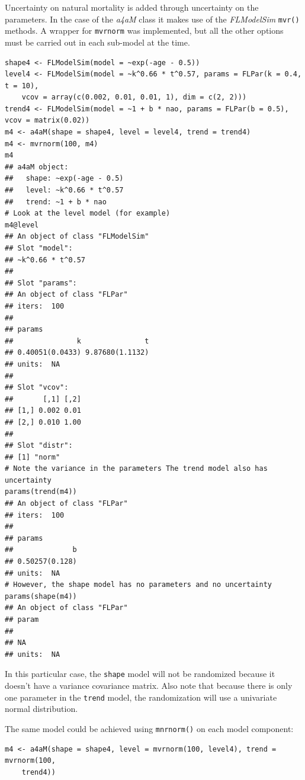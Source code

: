 \documentclass[a4paper,english,10pt]{article}\usepackage[]{graphicx}\usepackage[]{color}
\makeatletter
\newenvironment{kframe}{%
 \def\at@end@of@kframe{}%
 \ifinner\ifhmode%
  \def\at@end@of@kframe{\end{minipage}}%
  \begin{minipage}{\columnwidth}%
 \fi\fi%
 \def\FrameCommand##1{\hskip\@totalleftmargin \hskip-\fboxsep
 \colorbox{shadecolor}{##1}\hskip-\fboxsep
     \hskip-\linewidth \hskip-\@totalleftmargin \hskip\columnwidth}%
 \MakeFramed {\advance\hsize-\width
   \@totalleftmargin\z@ \linewidth\hsize
   \@setminipage}}%
 {\par\unskip\endMakeFramed%
 \at@end@of@kframe}
\newenvironment{knitrout}{}{} %
\newcommand{\code}[1]{{\texttt{#1}}}
\newcommand{\class}[1]{{\textit{#1}}}
\makeatother
\begin{document}
Uncertainty on natural mortality is added through uncertainty on the parameters. In the case of the \class{a4aM} class it makes use of the \class{FLModelSim} \code{mvr()} methods. A wrapper for \code{mvrnorm} was implemented, but all the other options must be carried out in each sub-model at the time.

\begin{knitrout}
\color{fgcolor}\begin{kframe}
\begin{verbatim}
shape4 <- FLModelSim(model = ~exp(-age - 0.5))
level4 <- FLModelSim(model = ~k^0.66 * t^0.57, params = FLPar(k = 0.4, t = 10), 
    vcov = array(c(0.002, 0.01, 0.01, 1), dim = c(2, 2)))
trend4 <- FLModelSim(model = ~1 + b * nao, params = FLPar(b = 0.5), vcov = matrix(0.02))
m4 <- a4aM(shape = shape4, level = level4, trend = trend4)
m4 <- mvrnorm(100, m4)
m4
## a4aM object:
##   shape: ~exp(-age - 0.5)
##   level: ~k^0.66 * t^0.57
##   trend: ~1 + b * nao
# Look at the level model (for example)
m4@level
## An object of class "FLModelSim"
## Slot "model":
## ~k^0.66 * t^0.57
## 
## Slot "params":
## An object of class "FLPar"
## iters:  100 
## 
## params
##               k               t 
## 0.40051(0.0433) 9.87680(1.1132) 
## units:  NA 
## 
## Slot "vcov":
##       [,1] [,2]
## [1,] 0.002 0.01
## [2,] 0.010 1.00
## 
## Slot "distr":
## [1] "norm"
# Note the variance in the parameters The trend model also has uncertainty
params(trend(m4))
## An object of class "FLPar"
## iters:  100 
## 
## params
##              b 
## 0.50257(0.128) 
## units:  NA
# However, the shape model has no parameters and no uncertainty
params(shape(m4))
## An object of class "FLPar"
## param
##    
## NA 
## units:  NA
\end{verbatim}
\end{kframe}
\end{knitrout}


In this particular case, the \code{shape} model will not be randomized because it doesn't have a variance covariance matrix. Also note that because there is only one parameter in the \code{trend} model, the randomization will use a univariate normal distribution.

The same model could be achieved using \code{mnrnorm()} on each model component:

\begin{knitrout}
\color{fgcolor}\begin{kframe}
\begin{verbatim}
m4 <- a4aM(shape = shape4, level = mvrnorm(100, level4), trend = mvrnorm(100, 
    trend4))
\end{verbatim}
\end{kframe}
\end{knitrout}
\end{document}
